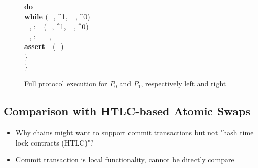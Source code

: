 \begin{figure}[H]
\begin{minipage}[t]{0.5\textwidth}
\begin{pchstack}[boxed]
{	\qquad \textbf{do} \: \st \gets {}_\bcb \\
	\qquad \textbf{while} \: \not\exists \:  \in \st \mid (\pk_{, \bcb}^1, \pk_{, \bcb}^0) \in {} \\
	\qquad \tx_{, \bcb} :=  \in \st \mid (\pk_{, \bcb}^1, \pk_{, \bcb}^0) \in {} \\
	\qquad \tx_{, \bca} :=  \oplus  \tx_{, \bcb} \\
	\qquad \textbf{assert} \: _\bca(\tx_{}) \\
        \quad \} \\
        \} \\
    }
    \end{pchstack}
    \end{minipage}%
    \caption{Full protocol execution for $P_0$ and $P_1$, respectively left and right}
    \label{fig:generic_atomic_protocol}
    \end{figure}

\subsection{Comparison with HTLC-based Atomic Swaps}
\begin{todobox}
\begin{itemize}
\item Why chains might want to support commit transactions but not "hash time lock contracts (HTLC)"? 
\item Commit transaction is local functionality, cannot be directly compare
\end{itemize}
\end{todobox}

\newpage
